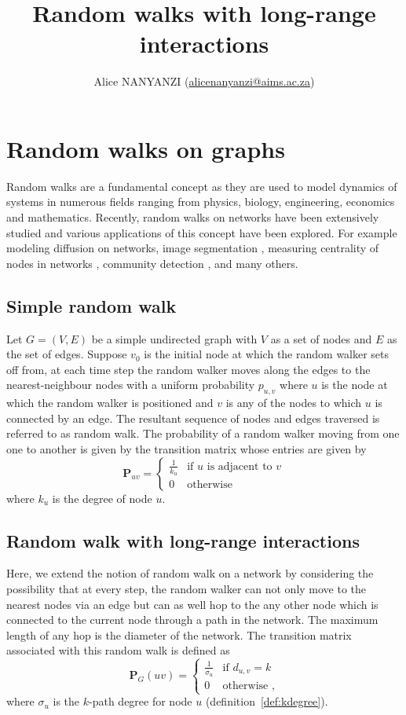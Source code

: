 \documentclass[10pt,a4paper]{article}
\author{Alice NANYANZI (\href{mailto:alicenanyanzi@aims.ac.za}{alicenanyanzi@aims.ac.za})}
\title{Random walks with long-range interactions}
\begin{document}
\maketitle
\section{Random walks on graphs}
Random walks are a fundamental concept as they are used to model dynamics of systems in numerous fields ranging from physics, biology, engineering, economics and mathematics. Recently, random walks on networks have been extensively studied \cite{newman2003structure,estrada2011structure} and various applications of this concept have been explored. For example modeling diffusion on networks, image segmentation \cite{grady2006random}, measuring centrality of nodes in networks \cite{chung2007heat}, community detection \cite{pons2005computing}, and many others.

\subsection{Simple random walk}
Let $G=(V,E)$ be a simple undirected graph with $V$ as a set of nodes and $E$ as the set of edges. Suppose $v_0$ is the initial node at which the random walker sets off from, at each time step the random walker moves along the edges to the nearest-neighbour nodes with a uniform probability $p_{u,v}$ where $u$ is the node at which the random walker is positioned and $v$ is any of the nodes to which $u$ is connected by an edge. The resultant sequence of nodes and edges traversed is referred to as random walk. The probability of a random walker moving from one one to another is given by the transition matrix whose entries are given by
\begin{equation}
\mathbf{P}_{uv} =  \begin{cases} 
\frac{1}{k_u}  & \mbox{if } u \text{ is adjacent to } v \\
0 &\mbox{otherwise }  
\end{cases} 
\end{equation}  
where $k_u$ is the degree of node $u$.

\subsection{Random walk with long-range interactions}
Here, we extend the notion of random walk on a network by considering the possibility that at every step, the random walker can not only move to the nearest nodes via an edge but can as well hop to the any other node which is connected to the current node through a path in the network. The maximum length of any hop is the diameter of the network. The transition matrix associated with this random walk is defined as
\begin{equation}
\mathbf{P}_{G}(uv) =  \begin{cases} 
\frac{1}{\sigma_{u}}  & \mbox{if } d_{u,v} = k \\
0 &\mbox{otherwise } , 
\end{cases} 
\end{equation} 
where $\sigma_u$ is the $k$-path degree for node $u$ (definition~\ref{def:kdegree}).

\newpage

\renewcommand{\bibname}{References}
\nocite{*}


\end{document}
